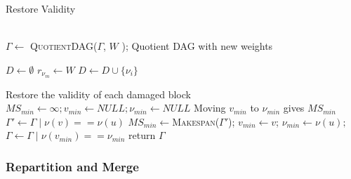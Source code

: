 \documentclass[11pt]{article}
\begin{document}
    \begin{algorithm}[h!]
        \caption{Restore Validity}
        \label{alg:RestoreValidity}
        \begin{algorithmic}[1]
                \\
                \State $\Gamma \gets $ \textsc{QuotientDAG}($\Gamma$, $W$ ); \Comment Quotient DAG with new weights

                \State $D \gets \emptyset$ 
                    \State $r_{\nu_m} \gets W$
                \EndFor
                    \label{line:damaged}
                        \State $D \gets D \cup \{\nu_i\}$
                    \EndIf
                \EndFor

                    \Comment Restore the validity of each damaged block
                        \State $MS_{min}\gets \infty; v_{min} \gets NULL; \nu_{min} \gets NULL$
                        \Comment Moving $v_{min}$ to $\nu_{min}$ gives $MS_{min}$
                                \label{line:neighb}
                                \State $\Gamma' \gets \Gamma \mid \nu(v) == \nu(u)$
                                    \label{line:makespan}
                                    \State $MS_{min} \gets $\textsc{Makespan}($\Gamma'$); $v_{min} \gets v$; $\nu_{min} \gets \nu(u);$
                                \EndIf
                            \EndFor
                        \EndFor
                        \State  $\Gamma \gets \Gamma \mid \nu(v_{min}) == \nu_{min}$ \label{line:movebest}
                    \EndWhile
                \EndFor
                \State return $\Gamma$
            \EndProcedure
        \end{algorithmic}
    \end{algorithm}

    \subsubsection{Repartition and Merge}
\end{document}
